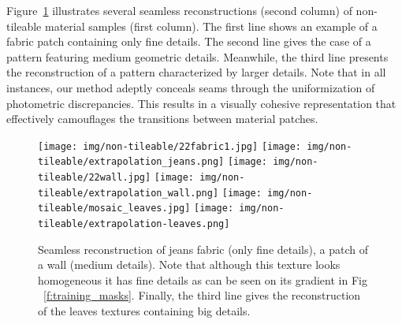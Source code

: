 \vspace{-0.2cm}




Figure~\ref{f:seamless_examples} illustrates several seamless reconstructions (second column) of non-tileable material samples (first column).
The first line shows an example of a fabric patch containing only fine details.
The second line gives the case of a pattern featuring medium geometric details. Meanwhile, the third line presents the reconstruction of a pattern characterized by larger details. 
Note that in all instances, our method adeptly conceals seams through the uniformization of photometric discrepancies. 
This results in a visually cohesive representation that effectively camouflages the transitions between material patches.
\begin{figure}[!h]
\centering
\texttt{[image: img/non-tileable/22fabric1.jpg]}
\texttt{[image: img/non-tileable/extrapolation\_jeans.png]}
\texttt{[image: img/non-tileable/22wall.jpg]}
\texttt{[image: img/non-tileable/extrapolation\_wall.png]}
\texttt{[image: img/non-tileable/mosaic\_leaves.jpg]}
\texttt{[image: img/non-tileable/extrapolation-leaves.png]}
\vspace{-0.4cm}
\caption{Seamless reconstruction of jeans fabric (only fine details), a patch of a wall (medium details). Note that although this texture looks homogeneous it has fine details as can be seen on its gradient in Fig ~\ref{f:training_masks}. Finally, the third line gives the reconstruction of the leaves textures containing big details.
}
\label{f:seamless_examples}
\end{figure}


